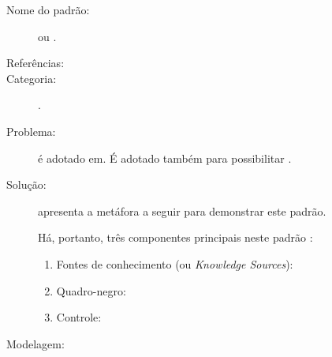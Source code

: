 \begin{description}
  \item[Nome do padrão:] \textit{} ou .
    \item[Referências:]    \citeonline{}
    \item[Categoria:] \textit{}.
    \item[Problema:] é adotado em. É adotado também para possibilitar .
    \item[Solução:]  apresenta a metáfora a seguir para demonstrar este padrão.



Há, portanto, três componentes principais neste padrão \cite{dong2005event}: 

\begin{enumerate}
    \item Fontes de conhecimento (ou \textit{Knowledge Sources}): 
    \item Quadro-negro: 
    \item Controle: 
\end{enumerate}



    \item[Modelagem:]   %

\end{description}
